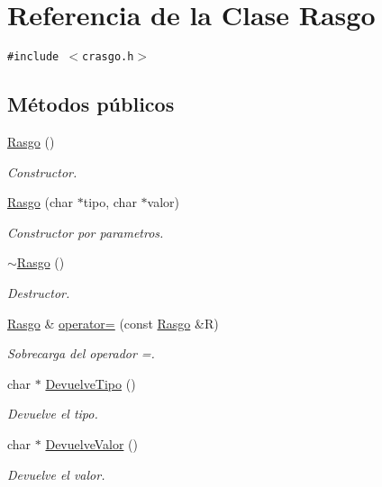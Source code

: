 \hypertarget{class_rasgo}{
\section{Referencia de la Clase Rasgo}
\label{class_rasgo}
}
{\tt \#include $<$crasgo.h$>$}

\subsection*{Métodos públicos}
\begin{CompactItemize}
\item 
\hyperlink{class_rasgo_4113ea8cb35ce2c98ff24ee733257438}{Rasgo} ()
\begin{CompactList}\small\item\em Constructor. \item\end{CompactList}\item 
\hyperlink{class_rasgo_a0b24a30e81c82a837eec32d2b0fdb5c}{Rasgo} (char $\ast$tipo, char $\ast$valor)
\begin{CompactList}\small\item\em Constructor por parametros. \item\end{CompactList}\item 
\hyperlink{class_rasgo_2371a4d82578769c926682d8a6b44414}{$\sim$Rasgo} ()
\begin{CompactList}\small\item\em Destructor. \item\end{CompactList}\item 
\hyperlink{class_rasgo}{Rasgo} \& \hyperlink{class_rasgo_915b93eab9642f2fe9dfef02561f04d8}{operator=} (const \hyperlink{class_rasgo}{Rasgo} \&R)
\begin{CompactList}\small\item\em Sobrecarga del operador =. \item\end{CompactList}\item 
char $\ast$ \hyperlink{class_rasgo_208a94566807a9565066df206cb246ef}{DevuelveTipo} ()
\begin{CompactList}\small\item\em Devuelve el tipo. \item\end{CompactList}\item 
char $\ast$ \hyperlink{class_rasgo_30e76ff8cd1878f6341f3d0b3ce97ef3}{DevuelveValor} ()
\begin{CompactList}\small\item\em Devuelve el valor. \item\end{CompactList}\end{CompactItemize}
